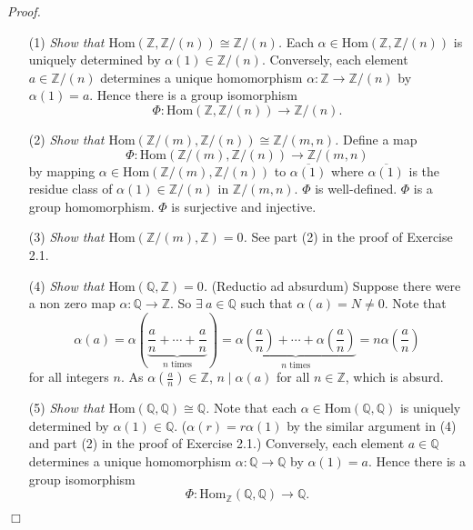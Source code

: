\documentclass{article}
\begin{document}
\emph{Proof.}
\begin{enumerate}
\item[(1)]
  \emph{Show that $\mathrm{Hom}(\mathbb{Z},\mathbb{Z}/(n)) \cong \mathbb{Z}/(n)$.}
  Each $\alpha \in \mathrm{Hom}(\mathbb{Z},\mathbb{Z}/(n))$
  is uniquely determined by $\alpha(1) \in \mathbb{Z}/(n)$.
  Conversely, each element $a \in \mathbb{Z}/(n)$ determines
  a unique homomorphism $\alpha: \mathbb{Z} \to \mathbb{Z}/(n)$ by $\alpha(1) = a$.
  Hence there is a group isomorphism
  \[
    \Phi: \mathrm{Hom}(\mathbb{Z},\mathbb{Z}/(n)) \to \mathbb{Z}/(n).
  \]

\item[(2)]
  \emph{Show that $\mathrm{Hom}(\mathbb{Z}/(m),\mathbb{Z}/(n)) \cong \mathbb{Z}/(m,n)$.}
  Define a map
  \[
    \Phi: \mathrm{Hom}(\mathbb{Z}/(m),\mathbb{Z}/(n)) \to \mathbb{Z}/(m,n)
  \]
  by mapping $\alpha \in \mathrm{Hom}(\mathbb{Z}/(m),\mathbb{Z}/(n))$ to $\overline{\alpha(1)}$
  where $\overline{\alpha(1)}$ is the residue class of $\alpha(1) \in \mathbb{Z}/(n)$
  in $\mathbb{Z}/(m,n)$.
  $\Phi$ is well-defined.
  $\Phi$ is a group homomorphism.
  $\Phi$ is surjective and injective.

\item[(3)]
  \emph{Show that $\mathrm{Hom}(\mathbb{Z}/(m),\mathbb{Z}) = 0$.}
  See part (2) in the proof of Exercise 2.1.

\item[(4)]
  \emph{Show that $\mathrm{Hom}(\mathbb{Q},\mathbb{Z}) = 0$.}
  (Reductio ad absurdum)
  Suppose there were a non zero map $\alpha: \mathbb{Q} \to \mathbb{Z}$.
  So $\exists \: a \in \mathbb{Q}$ such that $\alpha(a) = N \neq 0$.
  Note that
  \[
    \alpha(a)
    = \alpha\left(\underbrace{\frac{a}{n} + \cdots + \frac{a}{n}}_{\text{$n$ times}} \right)
    = \underbrace{\alpha\left( \frac{a}{n} \right) + \cdots + \alpha\left( \frac{a}{n} \right)}_{
        \text{$n$ times}}
    = n \alpha\left( \frac{a}{n} \right)
  \]
  for all integers $n$.
  As $\alpha\left( \frac{a}{n} \right) \in \mathbb{Z}$,
  $n \mid \alpha(a)$ for all $n \in \mathbb{Z}$, which is absurd.

\item[(5)]
  \emph{Show that $\mathrm{Hom}(\mathbb{Q},\mathbb{Q}) \cong \mathbb{Q}$.}
  Note that each $\alpha \in \mathrm{Hom}(\mathbb{Q},\mathbb{Q})$
  is uniquely determined by $\alpha(1) \in \mathbb{Q}$.
  ($\alpha(r) = r\alpha(1)$ by the similar argument in (4) and part (2) in the proof of Exercise 2.1.)
  Conversely, each element $a \in \mathbb{Q}$ determines
  a unique homomorphism $\alpha: \mathbb{Q} \to \mathbb{Q}$ by $\alpha(1) = a$.
  Hence there is a group isomorphism
  \[
    \Phi: \mathrm{Hom}_{\mathbb{Z}}(\mathbb{Q},\mathbb{Q}) \to \mathbb{Q}.
  \]
\end{enumerate}
$\Box$ \\\\



\end{document}
